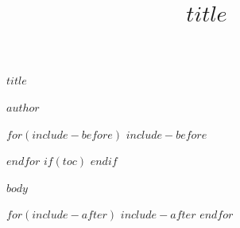 \documentclass[$if(fontsize)$$fontsize$,$endif$$if(lang)$$lang$,$endif$$if(papersize)$$papersize$,$endif$$for(classoption)$$classoption$$sep$,$endfor$]{$documentclass$}
\title{$title$}
\title{}
\newcommand{\doctitle}{$title$}
\begin{document}
\thispagestyle{empty}
\begin{center}


%
{\huge \doctitle}

\vspace{0.5cm}

$author$

\vspace{0.6cm}

\end{center}



$for(include-before)$
$include-before$

$endfor$
$if(toc)$
{
\hypersetup{linkcolor=$if(toccolor)$$toccolor$$else$black$endif$}
\setcounter{tocdepth}{$toc-depth$}
\tableofcontents
}
$endif$

%

$body$

$for(include-after)$
$include-after$
$endfor$
\end{document}
